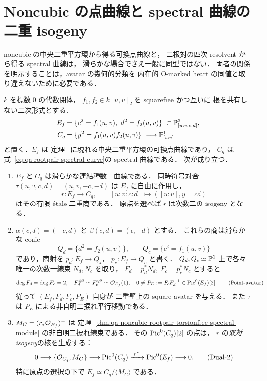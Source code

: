 \section{Noncubic の点曲線と spectral 曲線の二重 isogeny}
\label{sec:qa-point-spectral-isogeny}

noncubic の中央二重平方環から得る可換点曲線と，
二根対の四次 resolvent から得る spectral 曲線は，
滑らかな場合でさえ一般に同型ではない．
両者の関係を明示することは，avatar の幾何的分類を
内在的 O-marked heart の同値と取り違えないために必要である．

\begin{theorem}
\label{thm:qa-point-spectral-dual-two-isogeny}
$k$ を標数 $0$ の代数閉体，
$f_1,f_2\in k[u,v]_2$ を squarefree かつ互いに
根を共有しない二次形式とする．
\[
 \begin{split}
 E_f&=\{c^2=f_1(u,v),\ d^2=f_2(u,v)\}
                   \ \subset\mathbb P^3_{[u:v:c:d]},\\
 C_q&=\{y^2=f_1(u,v)f_2(u,v)\}
             \ \longrightarrow\mathbb P^1_{[u:v]}
 \end{split}
\]
と置く．$E_f$ は
定理~\cite[\texttt{thm:ore-anticommuting-central}]{QuadricIntrinsic2026}
に現れる中央二重平方環の可換点曲線であり，
$C_q$ は
式~\eqref{eq:qa-rootpair-spectral-curve}の
spectral 曲線である．
次が成り立つ．
\begin{enumerate}
\item $E_f$ と $C_q$ は滑らかな連結種数一曲線である．
 同時符号対合
 $\tau(u,v,c,d)=(u,v,-c,-d)$ は $E_f$ に自由に作用し，
 \[
   r:E_f\longrightarrow C_q,\qquad
   [u:v:c:d]\longmapsto([u:v],y=cd)
   \tag{Point--spectral}\label{eq:qa-point-spectral-cover}
 \]
 はその有限 \'{e}tale 二重商である．
 原点を選べば $r$ は次数二の isogeny となる．
\item $\alpha(c,d)=(-c,d)$ と $\beta(c,d)=(c,-d)$ とする．
 これらの商は滑らかな conic
 \[
    Q_d=\{d^2=f_2(u,v)\},\qquad
    Q_c=\{c^2=f_1(u,v)\}
 \]
 であり，商射を $p_d:E_f\to Q_d$，
 $p_c:E_f\to Q_c$ と書く．
 $Q_d,Q_c\simeq\mathbb P^1$ 上で各々唯一の次数一線束
 $N_d,N_c$ を取り，
 $F_d=p_d^*N_d,\ F_c=p_c^*N_c$ とすると
 \[
   \deg F_d=\deg F_c=2,\quad
   F_d^{\otimes2}\simeq F_c^{\otimes2}
       \simeq\mathcal O_{E_f}(1),\quad
   0\ne P_E:=F_cF_d^{-1}\in\operatorname{Pic}^0(E_f)[2].
   \tag{Point-avatar}\label{eq:qa-point-curve-double-wall}
 \]
 従って $(E_f,F_d,F_c,P_E)$ 自身が
 二重壁上の square avatar を与える．
 また $\tau$ は $P_E$ による非自明二捩れ平行移動である．
\item
 $M_C=(r_*\mathcal O_{E_f})^-$ は
 定理~\ref{thm:qa-noncubic-rootpair-torsionfree-spectral-module}
 の非自明二捩れ線束である．
 その $\operatorname{Pic}^0(C_q)[2]$ の点は，
 $r$ の\emph{双対 isogeny}の核を生成する：
 \[
     0\longrightarrow
       \{\mathcal O_{C_q},M_C\}
       \longrightarrow\operatorname{Pic}^0(C_q)
       \xrightarrow{\ r^*\ }\operatorname{Pic}^0(E_f)
       \longrightarrow0.
       \tag{Dual-2}\label{eq:qa-point-spectral-dual-isogeny}
 \]
 特に原点の選択の下で
 $E_f\simeq C_q/\langle M_C\rangle$ である．
\end{enumerate}
\end{theorem}
